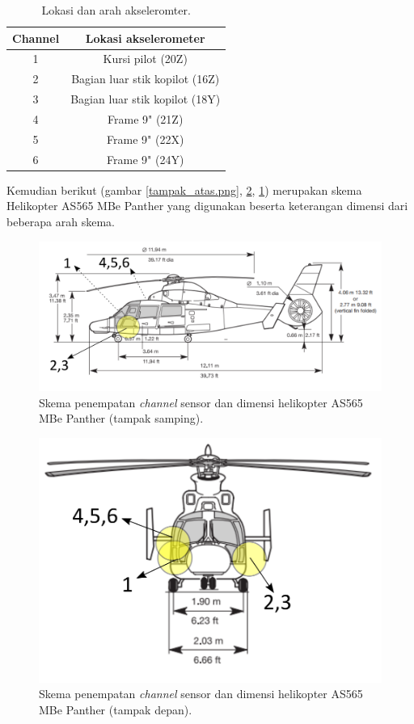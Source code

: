 \begin{longtable}{|c|c|}
	\caption{Lokasi dan arah akseleromter.}
	\label{tb:lokasiakselero}                        	\\
	\hline
	\textbf{Channel} & \textbf{Lokasi akselerometer} 	\\
	\hline
	1            	 & Kursi pilot (20Z)             	\\
	\hline
	2			     & Bagian luar stik kopilot (16Z)   \\
	\hline
	3				 & Bagian luar stik kopilot	(18Y)   \\
	\hline
	4				 & Frame 9" (21Z)                   \\
	\hline
	5				 & Frame 9" (22X)					\\
	\hline
	6				 & Frame 9" (24Y)					\\
	\hline
\end{longtable}

Kemudian berikut (gambar \ref{tampak_atas.png}, \ref{tampak_depan.png}, \ref{tampak_samping.png}) merupakan skema Helikopter AS565 MBe Panther yang digunakan beserta keterangan dimensi dari beberapa arah skema.

\begin{figure}[H]
	\centering
	\includegraphics[width=0.65\linewidth]{gambar/tampak_samping.png}
	\caption{Skema penempatan \textit{channel} sensor dan dimensi helikopter AS565 MBe Panther (tampak samping).}
	\label{tampak_samping.png}
\end{figure}

\begin{figure}[H]
	\centering
	\includegraphics[width=0.6\linewidth]{gambar/tampak_depan.png}
	\caption{Skema penempatan \textit{channel} sensor dan dimensi helikopter AS565 MBe Panther (tampak depan).}
	\label{tampak_depan.png}
\end{figure}

